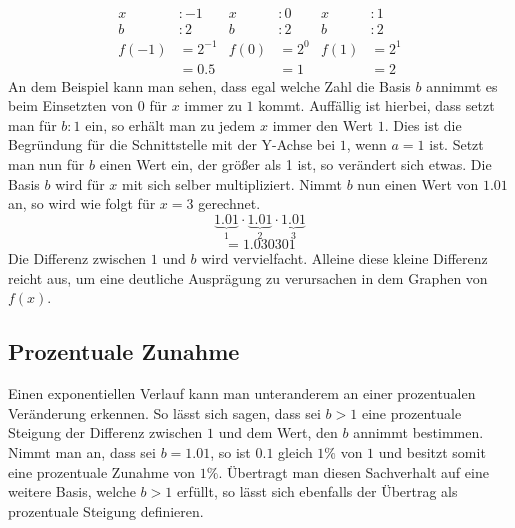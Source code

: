 \begin{align*}
x&:-1           &  x &: 0              &  x &:1\\
b&:2			& b&:2					& b&:2\\
f(-1)&=2^{-1}	& f(0)&=2^0	& f(1)&=2^1\\  
&=0.5  & &=1 & &=2
\end{align*}
An dem Beispiel kann man sehen, dass egal welche Zahl die Basis $b$ annimmt es beim Einsetzten von
$0$ für $x$ immer zu $1$ kommt. Auffällig ist hierbei, dass setzt man für $b : 1$ ein, so erhält man zu jedem $x$ immer den Wert $1$. Dies ist die Begründung für die Schnittstelle mit der Y-Achse bei $1$, wenn $a=1$ ist. Setzt man nun für $b$ einen Wert ein, der größer als 1 ist, so verändert sich etwas. Die Basis $b$ wird für $x$ mit sich selber multipliziert. Nimmt $b$ nun einen Wert von $1.01$ an, so wird wie folgt für $x=3$ gerechnet. 
	\[\underbrace{1.01}_{1}\cdot\underbrace{1.01}_{2}\cdot\underbrace{1.01}_{3}\]
	\[=1.030301\]
	Die Differenz zwischen $1$ und $b$ wird vervielfacht. Alleine diese kleine Differenz reicht aus, um eine deutliche Ausprägung zu verursachen in dem Graphen von $f(x)$.
	
	
 

 

 
 \subsection{Prozentuale Zunahme}\label{sec:Exponentialfunktionen/Prozentuale Zunahme}
 Einen exponentiellen Verlauf kann man unteranderem an einer prozentualen Veränderung erkennen. So lässt sich sagen, dass sei $b>1$ eine prozentuale Steigung der Differenz zwischen
 $1$ und dem Wert, den $b$ annimmt bestimmen. \\
 Nimmt man an, dass sei $b=1.01$, so ist $0.1$ gleich $1\%$ von $1$ und besitzt somit eine prozentuale Zunahme von $1\%$. Übertragt man diesen Sachverhalt auf eine weitere Basis,
 welche $b>1$ erfüllt, so lässt sich ebenfalls der Übertrag als prozentuale Steigung definieren.
